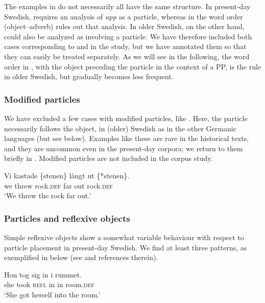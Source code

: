 \documentclass[output=paper]{langscibook}
\begin{document}
The examples in  do not necessarily all have the same structure. In present-day Swedish,  requires an analysis of \textit{upp} as a particle, whereas in  the word order (object–adverb) rules out that analysis. In older Swedish, on the other hand,  could also be analyzed as involving a particle. We have therefore included both cases corresponding to  and  in the study, but we have annotated them so that they can easily be treated separately. As we will see in the following, the word order in , with the object preceding the particle in the context of a PP, is the rule in older Swedish, but gradually becomes less frequent.



\subsubsection{Modified particles} 
We have excluded a few cases with modified particles, like . Here, the particle necessarily follows the object, in (older) Swedish as in the other Germanic languages (but see  below). Examples like these are rare in the historical texts, and they are uncommon even in the present-day corpora; we return to them briefly in . Modified particles are not included in the corpus study.


\ea\label{ex:lalu:18}
\gll Vi    kastade   \{stenen\}     långt  ut \{*stenen\}.\\
we    threw       rock\textsc{.def}   far   out     rock\textsc{.def}    \\
\glt `We threw the rock far out.'
\z


\subsubsection{Particles and reflexive objects} 
Simple reflexive objects show a somewhat variable behaviour with respect to particle placement in present-day Swedish. We find at least three patterns, as exemplified in  below (see \citealt{Lundquist2014Reflexive} and references therein).


\ea\label{ex:lalu:19}
\ea\label{ex:lalu:19a}
\gll  Hon   tog     sig     in   i     rummet.\\
    she       took   \textsc{refl}   in   in     room\textsc{.def}\\
\glt `She got herself into the room.’\\
\end{document}
